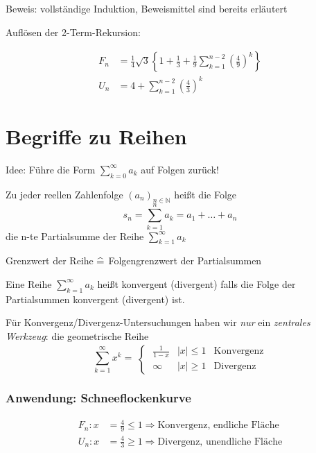 Beweis: vollständige Induktion, Beweismittel sind bereits erläutert

Auflösen der 2-Term-Rekursion:

\begin{align*}
    F_n &= \frac{1}{4} \sqrt{3} \left\{ 1 + \frac{1}{3} + \frac{1}{9} \sum_{k=1}^{n-2} \left( \frac{4}{9} \right)^k \right\} \\
    U_n &= 4 + \sum_{k=1}^{n-2} \left( \frac{4}{3} \right)^k
\end{align*}

\section{Begriffe zu Reihen}

Idee: Führe die Form $\sum_{k=0}^{\infty} a_k$ auf Folgen zurück!

\begin{definition} Zu jeder reellen Zahlenfolge $(a_n)_{n \in \mathbb{N}}$ heißt die Folge
\begin{equation*}
    s_n = \sum_{k=1}^n a_k = a_1 + \dots + a_n
\end{equation*}
die n-te Partialsumme der Reihe $\sum_{k=1}^{\infty} a_k$
\end{definition}

Grenzwert der Reihe $\mathrel{\widehat{=}}$ Folgengrenzwert der Partialsummen \\

\begin{definition}
Eine Reihe $\sum_{k=1}^{\infty} a_k$ heißt konvergent (divergent) falls die Folge der Partialsummen konvergent (divergent) ist.
\end{definition}

Für Konvergenz/Divergenz-Untersuchungen haben wir \emph{nur} ein \emph{zentrales Werkzeug}: die geometrische Reihe
\begin{equation*}
    \left. \sum_{k=1}^{\infty} x^k = \right\{ \begin{array}{cll}
                                                    \frac{1}{1-x} & |x| \le 1 &\text{Konvergenz}\\
                                                    \infty & |x| \geq 1 & \text{Divergenz}
                                                \end{array}
\end{equation*}

\subsubsection*{Anwendung: Schneeflockenkurve}
\begin{align*}
    F_n: x &= \frac{4}{9} \le 1 \Rightarrow \text{Konvergenz, endliche Fläche} \\
    U_n: x &= \frac{4}{3} \ge 1 \Rightarrow \text{Divergenz, unendliche Fläche}
\end{align*}

